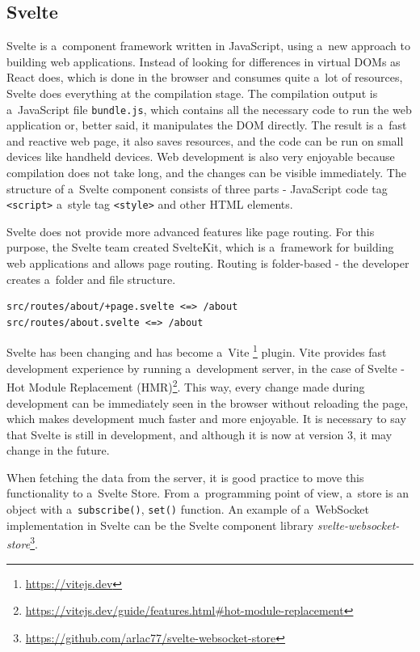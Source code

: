 \subsection{Svelte}\label{txt.design.frontend.svelte}

Svelte is a~component framework written in JavaScript, using a~new approach to building web applications. Instead of looking for differences in virtual DOMs as React does, which is done in the browser and consumes quite a~lot of resources, Svelte does everything at the compilation stage. The compilation output is a~JavaScript file \verb|bundle.js|, which contains all the necessary code to run the web application or, better said, it manipulates the DOM directly. The result is a~fast and reactive web page, it also saves resources, and the code can be run on small devices like handheld devices. Web development is also very enjoyable because compilation does not take long, and the changes can be visible immediately. The structure of a~Svelte component consists of three parts - JavaScript code tag \verb|<script>| a~style tag \verb|<style>| and other HTML elements. 

Svelte does not provide more advanced features like page routing. For this purpose, the Svelte team created SvelteKit, which is a~framework for building web applications and allows page routing. Routing is folder-based - the developer creates a~folder and file structure.

\begin{verbatim}
src/routes/about/+page.svelte <=> /about
src/routes/about.svelte <=> /about
\end{verbatim}

Svelte has been changing and has become a~Vite \footnote{\url{https://vitejs.dev}} plugin. Vite provides fast development experience by running a~development server, in the case of Svelte - Hot Module Replacement (HMR)\footnote{\url{https://vitejs.dev/guide/features.html\#hot-module-replacement}}. This way, every change made during development can be immediately seen in the browser without reloading the page, which makes development much faster and more enjoyable. It is necessary to say that Svelte is still in development, and although it is now at version 3, it may change in the future. 

When fetching the data from the server, it is good practice to move this functionality to a~Svelte Store. From a~programming point of view, a~store is an object with a~\texttt{subscribe()}, \texttt{set()} function. An example of a~WebSocket implementation in Svelte can be the Svelte component library \textit{svelte-websocket-store}\footnote{\url{https://github.com/arlac77/svelte-websocket-store}}.




